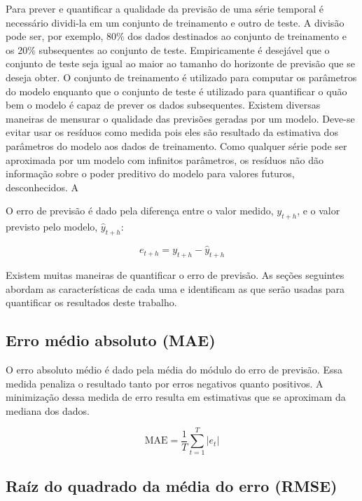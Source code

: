 \documentclass[
	12pt,				%
	openright,			%
	oneside,			%
	a4paper,			%
	english,			%
	french,				%
	spanish,			%
	brazil				%
	]{abntex2}
\begin{document}
Para prever e quantificar a qualidade da previsão de uma série temporal é necessário dividi-la em um conjunto de treinamento e outro de teste. A divisão pode ser, por exemplo, 80\% dos dados destinados ao conjunto de treinamento e os 20\% subsequentes ao conjunto de teste. Empiricamente é desejável que o conjunto de teste seja igual ao maior ao tamanho do horizonte de previsão que se deseja obter. O conjunto de treinamento é utilizado para computar os parâmetros do modelo enquanto que o conjunto de teste é utilizado para quantificar o quão bem o modelo é capaz de prever os dados subsequentes.
Existem diversas maneiras de mensurar o qualidade das previsões geradas por um modelo. Deve-se evitar usar os resíduos como medida pois eles são resultado da estimativa dos parâmetros do modelo aos dados de treinamento. Como qualquer série pode ser aproximada por um modelo com infinitos parâmetros, os resíduos não dão informação sobre o poder preditivo do modelo para valores futuros, desconhecidos. A


O erro de previsão é dado pela diferença entre o valor medido, $y_{t+h}$, e o valor previsto pelo modelo, $\hat{y}_{t+h}$:

$$e_{t+h} = y_{t+h} - \hat{y}_{t+h}$$

Existem muitas maneiras de quantificar o erro de previsão. As seções seguintes abordam as características de cada uma e identificam as que serão usadas para quantificar os resultados deste trabalho.

\subsection{Erro médio absoluto (MAE)}

O erro absoluto médio é dado pela média do módulo do erro de previsão. Essa medida penaliza o resultado tanto por erros negativos quanto positivos. A minimização dessa medida de erro resulta em estimativas que se aproximam da mediana dos dados.

$$\text{MAE} = \frac{1}{T}\sum_{t=1}^{T}\left|e_{t}\right|$$

\subsection{Raíz do quadrado da média do erro (RMSE)}
\end{document}
